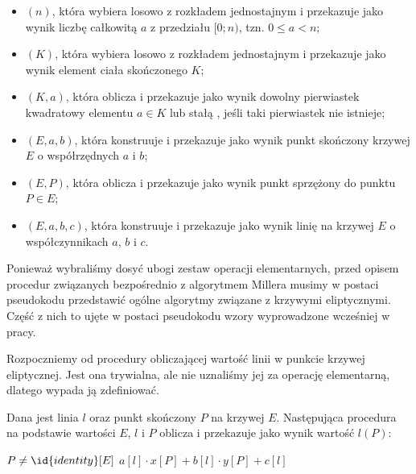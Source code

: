 \begin{remark}
\begin{itemize}
\begin{itemize}
\item {}$(n)$, 
która wybiera losowo z rozkładem jednostajnym i przekazuje jako wynik
liczbę całkowitą $a$ z przedziału $[0; n)$, tzn. $0 \leq a < n$;
\item {}$(K)$,
która wybiera losowo z rozkładem jednostajnym i przekazuje jako wynik
element ciała skończonego $K$;
\item {}$(K, a)$,
która oblicza i przekazuje jako \linebreak wynik
dowolny pierwiastek kwadratowy elementu $a \in K$
lub stałą , jeśli taki pierwiastek nie istnieje;
\item {}$(E, a, b)$,
która konstruuje i przekazuje jako wynik
punkt skończony krzywej $E$ o współrzędnych $a$ i $b$;
\item {}$(E, P)$,
która oblicza i przekazuje jako wynik
punkt sprzężony do punktu $P \in E$;
\item {}$(E, a, b, c)$,
która konstruuje i przekazuje jako wynik
linię na krzywej $E$ o współczynnikach $a$, $b$ i $c$.
\end{itemize}
\end{itemize}
\end{remark}

\noindent
Ponieważ wybraliśmy dosyć ubogi zestaw operacji elementarnych,
przed opisem procedur związanych bezpośrednio z algorytmem Millera
musimy w postaci pseudokodu przedstawić
ogólne algorytmy związane z krzywymi eliptycznymi.
Część z nich to ujęte w postaci pseudokodu
wzory wyprowadzone wcześniej w pracy.

\noindent
Rozpoczniemy od procedury obliczającej
wartość linii w punkcie krzywej eliptycznej.
Jest ona trywialna, ale nie uznaliśmy jej za operację elementarną,
dlatego wypada ją zdefiniować.

\begin{algorithm}
Dana jest linia $l$ oraz punkt skończony $P$ na krzywej $E$.
Następująca procedura
na podstawie wartości $E$, $l$ i $P$
oblicza i przekazuje jako wynik
wartość $l(P)$:

\begin{codebox}
\li \Assert $P \neq \id{identity}[E]$
\li \Return $a[l]\cdot x[P] + b[l]\cdot y[P] + c[l]$
\end{codebox}
\end{algorithm}

